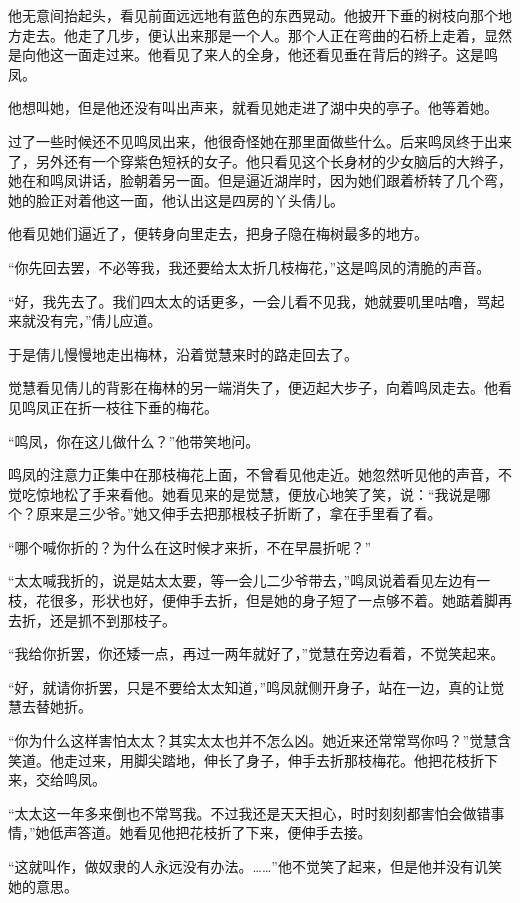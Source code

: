 \par 他无意间抬起头，看见前面远远地有蓝色的东西晃动。他披开下垂的树枝向那个地方走去。他走了几步，便认出来那是一个人。那个人正在弯曲的石桥上走着，显然是向他这一面走过来。他看见了来人的全身，他还看见垂在背后的辫子。这是鸣凤。
\par 他想叫她，但是他还没有叫出声来，就看见她走进了湖中央的亭子。他等着她。
\par 过了一些时候还不见鸣凤出来，他很奇怪她在那里面做些什么。后来鸣凤终于出来了，另外还有一个穿紫色短袄的女子。他只看见这个长身材的少女脑后的大辫子，她在和鸣凤讲话，脸朝着另一面。但是逼近湖岸时，因为她们跟着桥转了几个弯，她的脸正对着他这一面，他认出这是四房的丫头倩儿。
\par 他看见她们逼近了，便转身向里走去，把身子隐在梅树最多的地方。
\par “你先回去罢，不必等我，我还要给太太折几枝梅花，”这是鸣凤的清脆的声音。
\par “好，我先去了。我们四太太的话更多，一会儿看不见我，她就要叽里咕噜，骂起来就没有完，”倩儿应道。
\par 于是倩儿慢慢地走出梅林，沿着觉慧来时的路走回去了。
\par 觉慧看见倩儿的背影在梅林的另一端消失了，便迈起大步子，向着鸣凤走去。他看见鸣凤正在折一枝往下垂的梅花。
\par “鸣凤，你在这儿做什么？”他带笑地问。
\par 鸣凤的注意力正集中在那枝梅花上面，不曾看见他走近。她忽然听见他的声音，不觉吃惊地松了手来看他。她看见来的是觉慧，便放心地笑了笑，说：“我说是哪个？原来是三少爷。”她又伸手去把那根枝子折断了，拿在手里看了看。
\par “哪个喊你折的？为什么在这时候才来折，不在早晨折呢？”
\par “太太喊我折的，说是姑太太要，等一会儿二少爷带去，”鸣凤说着看见左边有一枝，花很多，形状也好，便伸手去折，但是她的身子短了一点够不着。她踮着脚再去折，还是抓不到那枝子。
\par “我给你折罢，你还矮一点，再过一两年就好了，”觉慧在旁边看着，不觉笑起来。
\par “好，就请你折罢，只是不要给太太知道，”鸣凤就侧开身子，站在一边，真的让觉慧去替她折。
\par “你为什么这样害怕太太？其实太太也并不怎么凶。她近来还常常骂你吗？”觉慧含笑道。他走过来，用脚尖踏地，伸长了身子，伸手去折那枝梅花。他把花枝折下来，交给鸣凤。
\par “太太这一年多来倒也不常骂我。不过我还是天天担心，时时刻刻都害怕会做错事情，”她低声答道。她看见他把花枝折了下来，便伸手去接。
\par “这就叫作，做奴隶的人永远没有办法。……”他不觉笑了起来，但是他并没有讥笑她的意思。
